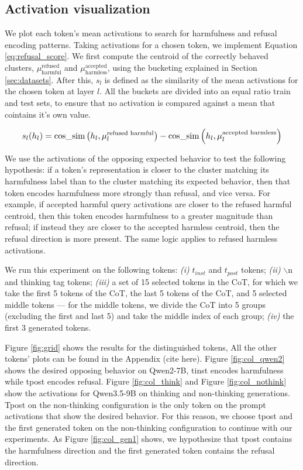 \documentclass[nohyperref]{article}
\theoremstyle{plain}
\theoremstyle{definition}
\theoremstyle{remark}
\begin{document}
\subsection{Activation visualization}
\label{sec:activations}
We plot each token's mean activations to search for harmfulness and refusal encoding patterns. Taking activations for a chosen token, we implement Equation \ref{eq:refusal_score}. We first compute the centroid of the correctly behaved clusters, $\mu_{\text{harmful}}^{\text{refused}}$ and $\mu_{\text{harmless}}^{\text{accepted}}$, using the bucketing explained in Section \ref{sec:datasets}. After this, $s_l$ is defined as the similarity of the mean activations for the chosen token at layer $l$. All the buckets are divided into an equal ratio train and test sets, to ensure that no activation is compared against a mean that cointains it's own value. 


\begin{equation}
\resizebox{0.92\linewidth}{!}{$\displaystyle s_l(h_l) = \text{cos\_sim}\left(h_l, \mu_l^{\text{refused harmful}}\right) - \text{cos\_sim}\left(h_l, \mu_l^{\text{accepted harmless}}\right)$}
\label{eq:refusal_score}
\end{equation}

We use the activations of the opposing expected behavior to test the following hypothesis: if a token's representation is closer to the cluster matching its harmfulness label than to the cluster matching its expected behavior, then that token encodes harmfulness more strongly than refusal, and vice versa. For example, if accepted harmful query activations are closer to the refused harmful centroid, then this token encodes harmfulness to a greater magnitude than refusal; if instead they are closer to the accepted harmless centroid, then the refusal direction is more present. The same logic applies to refused harmless activations.

We run this experiment on the following tokens: \emph{(i)} $t_{inst}$ and $t_{post}$ tokens; \emph{(ii)} $\backslash$n and thinking tag tokens; \emph{(iii)} a set of 15 selected tokens in the CoT, for which we take the first 5 tokens of the CoT, the last 5 tokens of the CoT, and 5 selected middle tokens — for the middle tokens, we divide the CoT into 5 groups (excluding the first and last 5) and take the middle index of each group; \emph{(iv)} the first 3 generated tokens.

Figure \ref{fig:grid} shows the results for the distinguished tokens, All the other tokens' plots can be found in the Appendix (cite here). Figure \ref{fig:col_qwen2} shows the desired opposing behavior on Qwen2-7B, tinst encodes harmfulness while tpost encodes refusal. Figure \ref{fig:col_think} and Figure \ref{fig:col_nothink} show the activations for Qwen3.5-9B on thinking and non-thinking generations. Tpost on the non-thinking configuration is the only token on the prompt activations that show the desired behavior. For this reason, we choose tpost and the first generated token on the non-thinking configuration to continue with our experiments. As Figure \ref{fig:col_gen1} shows, we hypothesize that tpost contains the harmfulness direction and the first generated token contains the refusal direction.
\end{document}
